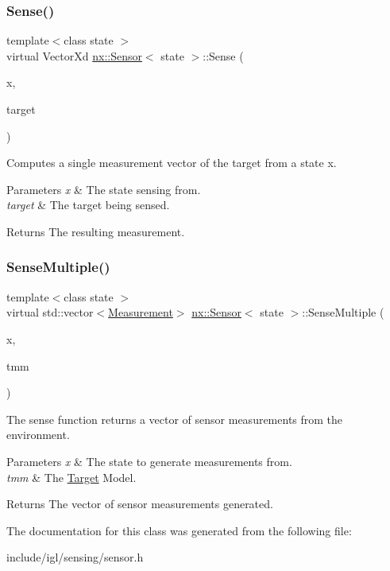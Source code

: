 \subsubsection{\texorpdfstring{Sense()}{Sense()}}
{\footnotesize\ttfamily template$<$class state $>$ \\
virtual Vector\+Xd \hyperlink{classnx_1_1Sensor}{nx\+::\+Sensor}$<$ state $>$\+::Sense (\begin{DoxyParamCaption}\item[{const state \&}]{x,  }\item[{const Vector\+Xd \&}]{target }\end{DoxyParamCaption})\hspace{0.3cm}{\ttfamily [pure virtual]}}

Computes a single measurement vector of the target from a state x. 
\begin{DoxyParams}{Parameters}
{\em x} & The state sensing from. \\
\hline
{\em target} & The target being sensed. \\
\hline
\end{DoxyParams}
\begin{DoxyReturn}{Returns}
The resulting measurement. 
\end{DoxyReturn}
\mbox{\label{classnx_1_1Sensor_a6c8d5300337277858d417f6279f851a7}} 
\subsubsection{\texorpdfstring{Sense\+Multiple()}{SenseMultiple()}}
{\footnotesize\ttfamily template$<$class state $>$ \\
virtual std\+::vector$<$\hyperlink{structnx_1_1Measurement}{Measurement}$>$ \hyperlink{classnx_1_1Sensor}{nx\+::\+Sensor}$<$ state $>$\+::Sense\+Multiple (\begin{DoxyParamCaption}\item[{const state \&}]{x,  }\item[{const std\+::shared\+\_\+ptr$<$ \hyperlink{classnx_1_1TargetModel}{Target\+Model} $>$ \&}]{tmm }\end{DoxyParamCaption})\hspace{0.3cm}{\ttfamily [pure virtual]}}

The sense function returns a vector of sensor measurements from the environment. 
\begin{DoxyParams}{Parameters}
{\em x} & The state to generate measurements from. \\
\hline
{\em tmm} & The \hyperlink{structnx_1_1Target}{Target} Model. \\
\hline
\end{DoxyParams}
\begin{DoxyReturn}{Returns}
The vector of sensor measurements generated. 
\end{DoxyReturn}


The documentation for this class was generated from the following file\+:\begin{DoxyCompactItemize}
\item 
include/igl/sensing/sensor.\+h\end{DoxyCompactItemize}

